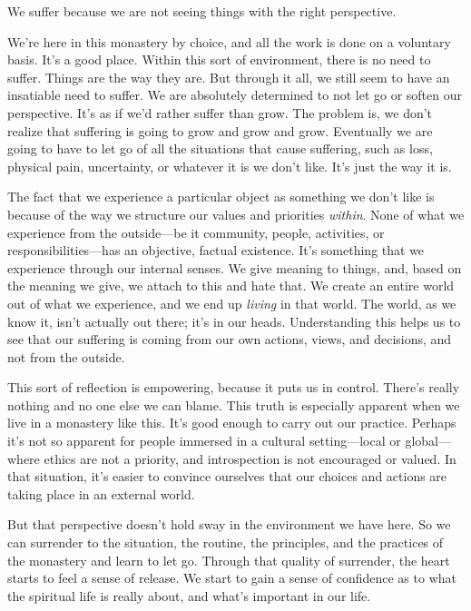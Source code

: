 
We suffer because we are not seeing things with the right perspective.

We're here in this monastery by choice, and all the work is done on a 
voluntary basis. It's a good place. Within this sort of environment, 
there is no need to suffer. Things are the way they are. But through it 
all, we still seem to have an insatiable need to suffer. We are 
absolutely determined to not let go or soften our perspective. It's as 
if we'd rather suffer than grow. The problem is, we don't realize that 
suffering is going to grow and grow and grow. Eventually we are going 
to have to let go of all the situations that cause suffering, such as 
loss, physical pain, uncertainty, or whatever it is we don't like. It's 
just the way it is.

The fact that we experience a particular object as something we don't 
like is because of the way we structure our values and priorities 
\emph{within}. None of what we experience from the outside---be it 
community, people, activities, or responsibilities---has an objective, 
factual existence. It's something that we experience through our 
internal senses. We give meaning to things, and, based on the meaning 
we give, we attach to this and hate that. We create an entire world out 
of what we experience, and we end up \emph{living} in that world. The 
world, as we know it, isn't actually out there; it's in our heads. 
Understanding this helps us to see that our suffering is coming from 
our own actions, views, and decisions, and not from the outside.

This sort of reflection is empowering, because it puts us in control. 
There's really nothing and no one else we can blame. This truth is 
especially apparent when we live in a monastery like this. It's good 
enough to carry out our practice. Perhaps it's not so apparent for 
people immersed in a cultural setting---local or global---where ethics 
are not a priority, and introspection is not encouraged or valued. In 
that situation, it's easier to convince ourselves that our choices and 
actions are taking place in an external world.

But that perspective doesn't hold sway in the environment we have here. 
So we can surrender to the situation, the routine, the principles, and 
the practices of the monastery and learn to let go. Through that 
quality of surrender, the heart starts to feel a sense of release. We 
start to gain a sense of confidence as to what the spiritual life is 
really about, and what's important in our life.

